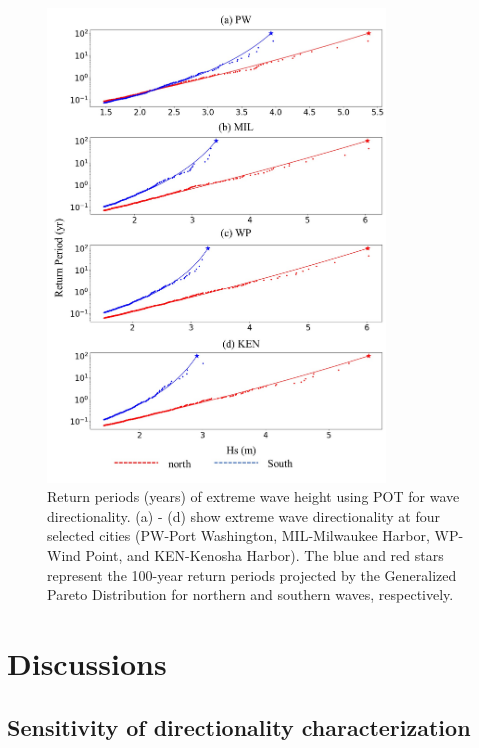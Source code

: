 \begin{figure}[htbp]
  \centering
  \includegraphics[width=0.8\textwidth]{chapter3/resources/figure3-8.jpg}
  \caption{Return periods (years) of extreme wave height using POT for wave directionality. (a) - (d) show extreme wave directionality at four selected cities (PW-Port Washington, MIL-Milwaukee Harbor, WP-Wind Point, and KEN-Kenosha Harbor). The blue and red stars represent the 100-year return periods projected by the Generalized Pareto Distribution for northern and southern waves, respectively.}
  \label{fig:fig3.8}
\end{figure}

\section{Discussions}
\label{c3_Discussions}

\subsection{Sensitivity of directionality characterization}
\label{c3_Sensitivity of directionality characterization}

